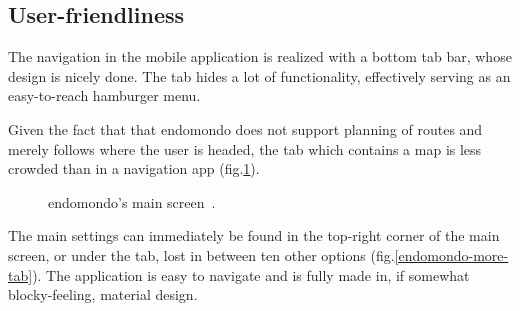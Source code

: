 \subsection*{User-friendliness}
The navigation in the mobile application is realized with a bottom tab bar, whose design is nicely done.
The  tab hides a lot of functionality, effectively serving as an easy-to-reach hamburger menu.

Given the fact that that endomondo does not support planning of routes and merely follows where the user is headed, the  tab which contains a map is less crowded than in a navigation app (fig.\ref{endomondo-home-img}).

\begin{figure}[h!]
    \centering
        \caption{endomondo's main screen~\cite{endomondo-home-img}.}
        \label{endomondo-home-img}
\end{figure}

The main settings can immediately be found in the top-right corner of the main screen, or under the  tab, lost in between ten other options (fig.\ref{endomondo-more-tab}).
The application is easy to navigate and is fully made in, if somewhat blocky-feeling, material design.


